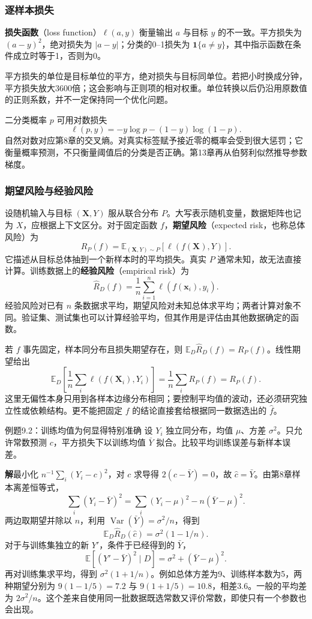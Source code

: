 \documentclass[UTF8,fontset=none,zihao=-4,a4paper]{ctexart}
\newcommand{\term}[1]{\textbf{#1}}
\newcommand{\sol}{\par\noindent\textbf{解}\quad}
\numberwithin{equation}{section}
\numberwithin{figure}{section}
\begin{document}
\subsubsection{逐样本损失}
\term{损失函数}（loss function）$\ell(a,y)$ 衡量输出 $a$ 与目标 $y$ 的不一致。平方损失为 $(a-y)^2$，绝对损失为 $|a-y|$；分类的0--1损失为 $\mathbf1\{a\ne y\}$，其中指示函数在条件成立时等于1，否则为0。

平方损失的单位是目标单位的平方，绝对损失与目标同单位。若把小时换成分钟，平方损失放大3600倍；这会影响与正则项的相对权重。单位转换以后仍沿用原数值的正则系数，并不一定保持同一个优化问题。

二分类概率 $p$ 可用对数损失
\[
 \ell(p,y)=-y\log p-(1-y)\log(1-p).
\]
自然对数对应第8章的交叉熵。对真实标签赋予接近零的概率会受到很大惩罚；它衡量概率预测，不只衡量阈值后的分类是否正确。第13章再从伯努利似然推导参数梯度。

\subsubsection{期望风险与经验风险}
设随机输入与目标 $(\symbf X,Y)$ 服从联合分布 $P$。大写表示随机变量，数据矩阵也记为 $X$，应根据上下文区分。对于固定函数 $f$，\term{期望风险}（expected risk，也称总体风险）为
\begin{equation}
 R_P(f)=\mathbb E_{(\symbf X,Y)\sim P}[\ell(f(\symbf X),Y)].
\end{equation}
它描述从目标总体抽到一个新样本时的平均损失。真实 $P$ 通常未知，故无法直接计算。训练数据上的\term{经验风险}（empirical risk）为
\begin{equation}
 \widehat R_D(f)=\frac1n\sum_{i=1}^n\ell(f(\symbf x_i),y_i).
\end{equation}
经验风险对已有 $n$ 条数据求平均，期望风险对未知总体求平均；两者计算对象不同。验证集、测试集也可以计算经验平均，但其作用是评估由其他数据确定的函数。

若 $f$ 事先固定，样本同分布且损失期望存在，则 $\mathbb E_D\widehat R_D(f)=R_P(f)$。线性期望给出
\[
 \mathbb E_D\!\left[\frac1n\sum_i\ell(f(\symbf X_i),Y_i)\right]
 =\frac1n\sum_i R_P(f)=R_P(f).
\]
这里无偏性本身只用到各样本边缘分布相同；要控制平均值的波动，还必须研究独立性或依赖结构。更不能把固定 $f$ 的结论直接套给根据同一数据选出的 $\widehat f$。

\begin{infobox}{例题9.2：训练均值为何显得特别准确}
设 $Y_i$ 独立同分布，均值 $\mu$、方差 $\sigma^2$。只允许常数预测 $c$，平方损失下以训练均值 $\bar Y$ 拟合。比较平均训练误差与新样本误差。
\end{infobox}
\sol 最小化 $n^{-1}\sum_i(Y_i-c)^2$，对 $c$ 求导得 $2(c-\bar Y)=0$，故 $\widehat c=\bar Y$。由第8章样本离差恒等式，
\[
 \sum_i(Y_i-\bar Y)^2=\sum_i(Y_i-\mu)^2-n(\bar Y-\mu)^2.
\]
两边取期望并除以 $n$，利用 $\operatorname{Var}(\bar Y)=\sigma^2/n$，得到
\[
 \mathbb E_D\widehat R_D(\widehat c)=\sigma^2(1-1/n).
\]
对于与训练集独立的新 $Y'$，条件于已经得到的 $\bar Y$，
\[
 \mathbb E[(Y'-\bar Y)^2\mid D]=\sigma^2+(\bar Y-\mu)^2.
\]
再对训练集求平均，得到 $\sigma^2(1+1/n)$。例如总体方差为9、训练样本数为5，两种期望分别为 $9(1-1/5)=7.2$ 与 $9(1+1/5)=10.8$，相差3.6。一般的平均差为 $2\sigma^2/n$。这个差来自使用同一批数据既选常数又评价常数，即使只有一个参数也会出现。
\end{document}
